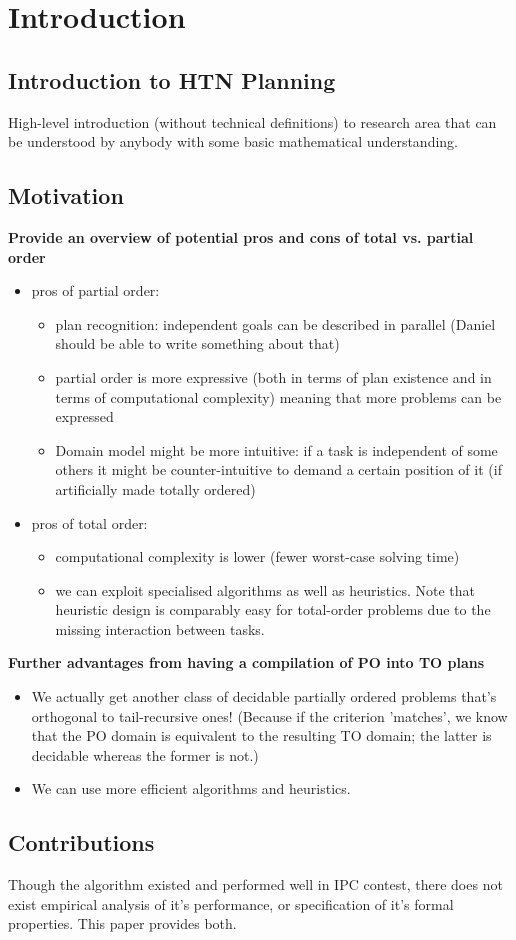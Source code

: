 \chapter{Introduction}

\section{Introduction to HTN Planning}
High-level introduction (without technical definitions) to research area that can be understood by anybody with some basic mathematical understanding.  

\section{Motivation}

\textbf{Provide an overview of potential pros and cons of total vs. partial order}
\begin{itemize}
	\item pros of partial order:
	\begin{itemize}
		\item plan recognition: independent goals can be described in parallel (Daniel should be able to write something about that)
		\item partial order is more expressive (both in terms of plan existence and in terms of computational complexity) meaning that more problems can be expressed
		\item Domain model might be more intuitive: if a task is independent of some others it might be counter-intuitive to demand a certain position of it (if artificially made totally ordered)
	\end{itemize}

   \item pros of total order:
    \begin{itemize}
   		\item computational complexity is lower (fewer worst-case solving time)
        \item we can exploit specialised algorithms as well as heuristics. Note that heuristic design is comparably easy for total-order problems due to the missing interaction between tasks.
   	\end{itemize}
\end{itemize}


\textbf{Further advantages from having a compilation of PO into TO plans}
\begin{itemize}
	\item We actually get another class of decidable partially ordered problems that's orthogonal to tail-recursive ones! (Because if the criterion 'matches', we know that the PO domain is equivalent to the resulting TO domain; the latter is decidable whereas the former is not.) 
	\item We can use more efficient algorithms and heuristics. 
\end{itemize}


\section{Contributions} 
Though the algorithm existed and performed well in IPC contest, there does not exist empirical analysis of it's performance, or specification of it's formal properties. This paper provides both.



